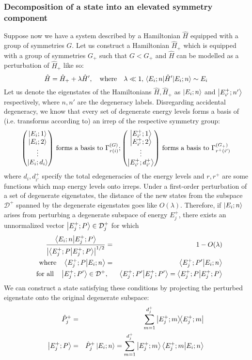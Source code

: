 \documentclass[12pt]{article}
\begin{document}
	\subsubsection{Decomposition of a state into an elevated symmetry component}
	Suppose now we have a system described by a Hamiltonian $\hat{H}$ equipped with a group of symmetries $G$. Let us construct a Hamiltonian $\hat{H}_+$ which is equipped with a group of symmetries $G_+$ such that $G<G_+$ and $\hat{H}$ can be modelled as a perturbation of $\hat{H}_+$ like so:
	$$\hat{H}=\hat{H}_+ + \lambda \hat{H}',\qq{where}\lambda\ll 1, \mel{E_i;n}{\hat{H}'}{E_i;n}\sim E_i$$
	Let us denote the eigenstates of the Hamiltonians $\hat{H},\hat{H}_+$ as $\ket{E_i;n}$ and $\ket{E^+_{i'};n'}$ respectively, where $n, n'$ are the degeneracy labels. Disregarding accidental degeneracy, we know that every set of degenerate energy levels forms a basis of (i.e. transforms according to) an irrep of the respective symmetry group:
	$$\mqty(\ket{E_i;1}\\\ket{E_i;2}\\\vdots\\\ket{E_i;d_i})\mbox{ forms a basis to }\Gamma^{(G)}_{r(i)}; \mqty(\ket{E^+_{i'};1}\\\ket{E^+_{i'};2}\\\vdots\\\ket{E^+_{i'};d^+_{i'}})\mbox{ forms a basis to }\Gamma^{\left(G_+\right)}_{r^+(i')}$$
	where $d_i, d^+_{i'}$ specify the total edegeneracies of the energy levels and $r,r^+$ are some functions which map energy levels onto irreps.
	Under a first-order perturbation of a set of degenerate eigenstates, the distance of the new states from the subspace $\mathcal{D}^+$ spanned by the degenerate eigenstates goes like $O(\lambda)$. Therefore, if $\ket{E_i;n}$ arises from perturbing a degenerate subspace of energy $E^+_j$, there exists an unnormalized vector $\ket{E^+_j;P}\in\mathcal{D}^+_j$ for which
	\begin{eqnarray*}
	\frac{\braket{E_i;n}{E^+_j;P}}{\abs{\braket{E^+_j;P}{E^+_j;P}}^{1/2}}&=&1-O(\lambda)\\
	\qq{where} \braket{E^+_j;P}{E_i;n}&=&\braket{E^+_j;P'}{E_i;n}\\
	\qq{for all} \ket{E^+_j;P'}\in\mathcal{D}^+&,& \braket{E^+_j;P'}{E^+_j;P'}=\braket{E^+_j;P}{E^+_j;P}
	\end{eqnarray*}
	We can construct a state satisfying these conditions by projecting the perturbed eigenstate onto the original degenerate subspace:
	\begin{eqnarray*}
	\hat{P}^+_j&=&\sum_{m=1}^{d^+_j}\dyad{E^+_j;m}{E^+_j;m}\\
	\ket{E^+_j;P}&=&\hat{P}^+_j\ket{E_i;n}=\sum_{m=1}^{d^+_j}\ket{E^+_j;m}\braket{E^+_j;m}{E_i;n}
	\end{eqnarray*}
\end{document}
